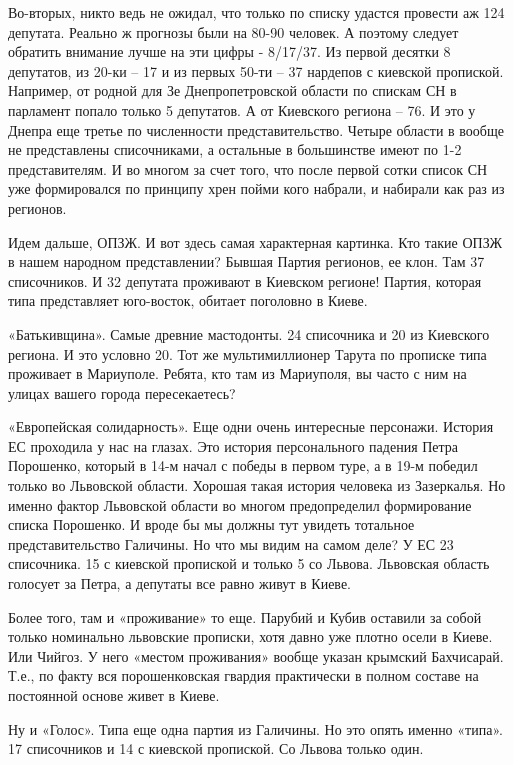 Во-вторых, никто ведь не ожидал, что только по списку удастся провести аж 124
депутата. Реально ж прогнозы были на 80-90 человек. А поэтому следует обратить
внимание лучше на эти цифры - 8/17/37. Из первой десятки 8 депутатов, из 20-ки
– 17 и из первых 50-ти – 37 нардепов с киевской пропиской. Например, от родной
для Зе Днепропетровской области по спискам СН в парламент попало только 5
депутатов. А от Киевского региона – 76. И это у Днепра еще третье по
численности представительство. Четыре области в вообще не представлены
списочниками, а остальные в большинстве имеют по 1-2 представителям. И во
многом за счет того, что после первой сотки список СН уже формировался по
принципу хрен пойми кого набрали, и набирали как раз из регионов.

Идем дальше, ОПЗЖ. И вот здесь самая характерная картинка. Кто такие ОПЗЖ в
нашем народном представлении? Бывшая Партия регионов, ее клон. Там 37
списочников. И 32 депутата проживают в Киевском регионе! Партия, которая типа
представляет юго-восток, обитает поголовно в Киеве.

«Батькивщина». Самые древние мастодонты. 24 списочника и 20 из Киевского
региона. И это условно 20. Тот же мультимиллионер Тарута по прописке типа
проживает в Мариуполе. Ребята, кто там из Мариуполя, вы часто с ним на улицах
вашего города пересекаетесь?

«Европейская солидарность». Еще одни очень интересные персонажи. История ЕС
проходила у нас на глазах. Это история персонального падения Петра Порошенко,
который в 14-м начал с победы в первом туре, а в 19-м победил только во
Львовской области. Хорошая такая история человека из Зазеркалья. Но именно
фактор Львовской области во многом предопределил формирование списка Порошенко.
И вроде бы мы должны тут увидеть тотальное представительство Галичины. Но что
мы видим на самом деле? У ЕС 23 списочника. 15 с киевской пропиской и только 5
со Львова. Львовская область голосует за Петра, а депутаты все равно живут в
Киеве.

Более того, там и «проживание» то еще. Парубий и Кубив оставили за собой только
номинально львовские прописки, хотя давно уже плотно осели в Киеве. Или Чийгоз.
У него «местом проживания» вообще указан крымский Бахчисарай. Т.е., по факту
вся порошенковская гвардия практически в полном составе на постоянной основе
живет в Киеве.

Ну и «Голос». Типа еще одна партия из Галичины. Но это опять именно «типа». 17
списочников и 14 с киевской пропиской. Со Львова только один.

